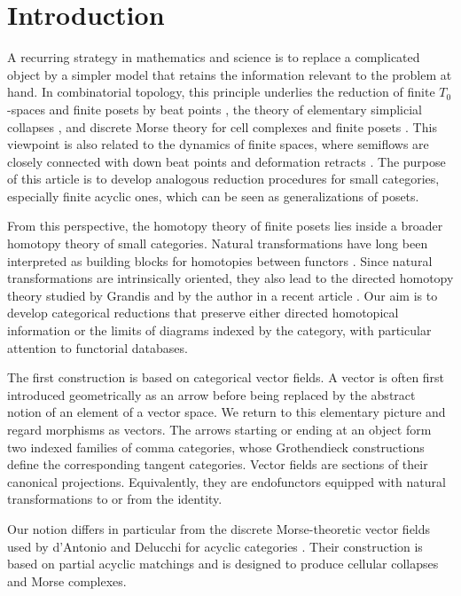 \documentclass[12pt]{amsart}
\theoremstyle{definition}
\theoremstyle{remark}
\numberwithin{figure}{section}%
\begin{document}
\section*{Introduction}
A recurring strategy in mathematics and science is to replace a complicated object by a simpler model that retains the information relevant to the problem at hand. In combinatorial topology, this principle underlies the reduction of finite \(T_0\)-spaces and finite posets by beat points \cite{Stong,MR3024764}, the theory of elementary simplicial collapses \cite{WhiteheadCollapse}, and discrete Morse theory for cell complexes and finite posets \cite{Forman,Scoville,MosqueraPosets}. This viewpoint is also related to the dynamics of finite spaces, where semiflows are closely connected with down beat points and deformation retracts \cite{ChocanoSemiflows,ChocanoFlowsAlexandroff}. The purpose of this article is to develop analogous reduction procedures for small categories, especially finite acyclic ones, which can be seen as generalizations of posets.

From this perspective, the homotopy theory of finite posets lies inside a broader homotopy theory of small categories. Natural transformations have long been interpreted as building blocks for homotopies between functors \cite{LEEHomotopy}. Since natural transformations are intrinsically oriented, they also lead to the directed homotopy theory studied by Grandis \cite{GrandisShape} and by the author in a recent article \cite{DirectedHomotopyDatabases}. Our aim is to develop categorical reductions that preserve either directed homotopical information or the limits of diagrams indexed by the category, with particular attention to functorial databases.

The first construction is based on categorical vector fields. A vector is often first introduced geometrically as an arrow before being replaced by the abstract notion of an element of a vector space. We return to this elementary picture and regard morphisms as vectors. The arrows starting or ending at an object form two indexed families of comma categories, whose Grothendieck constructions define the corresponding tangent categories. Vector fields are sections of their canonical projections. Equivalently, they are endofunctors equipped with natural transformations to or from the
identity.

Our notion differs in particular from the discrete Morse-theoretic vector fields used by d'Antonio and Delucchi for acyclic categories \cite{dAntonioDelucchiToricArrangements}. Their construction is based on partial acyclic matchings and is designed to produce cellular collapses and Morse complexes.
\end{document}
